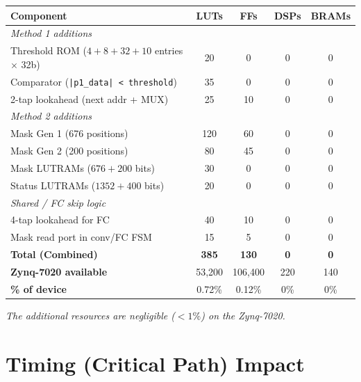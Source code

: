 \documentclass[11pt,a4paper]{article}
\begin{document}
\begin{center}
\begin{tabular}{lcccc}
\toprule
\textbf{Component} & \textbf{LUTs} & \textbf{FFs} & \textbf{DSPs} & \textbf{BRAMs} \\
\midrule
\multicolumn{5}{l}{\textit{Method 1 additions}} \\
  Threshold ROM ($4+8+32+10$ entries $\times$ 32b) & 20 & 0 & 0 & 0 \\
  Comparator (\texttt{|p1\_data| < threshold}) & 35 & 0 & 0 & 0 \\
  2-tap lookahead (next addr + MUX) & 25 & 10 & 0 & 0 \\
\midrule
\multicolumn{5}{l}{\textit{Method 2 additions}} \\
  Mask Gen 1 (676 positions) & 120 & 60 & 0 & 0 \\
  Mask Gen 2 (200 positions) & 80 & 45 & 0 & 0 \\
  Mask LUTRAMs ($676+200$ bits) & 30 & 0 & 0 & 0 \\
  Status LUTRAMs ($1352+400$ bits) & 20 & 0 & 0 & 0 \\
\midrule
\multicolumn{5}{l}{\textit{Shared / FC skip logic}} \\
  4-tap lookahead for FC & 40 & 10 & 0 & 0 \\
  Mask read port in conv/FC FSM & 15 & 5 & 0 & 0 \\
\midrule
\midrule
\textbf{Total (Combined)} & \textbf{385} & \textbf{130} & \textbf{0} & \textbf{0} \\
\textbf{Zynq-7020 available} & 53,200 & 106,400 & 220 & 140 \\
\textbf{\% of device} & 0.72\% & 0.12\% & 0\% & 0\% \\
\bottomrule
\end{tabular}
\end{center}

\noindent\textit{The additional resources are negligible ($<1\%$) on the Zynq-7020.}

\section{Timing (Critical Path) Impact}
\label{sec:timing}
\end{document}
